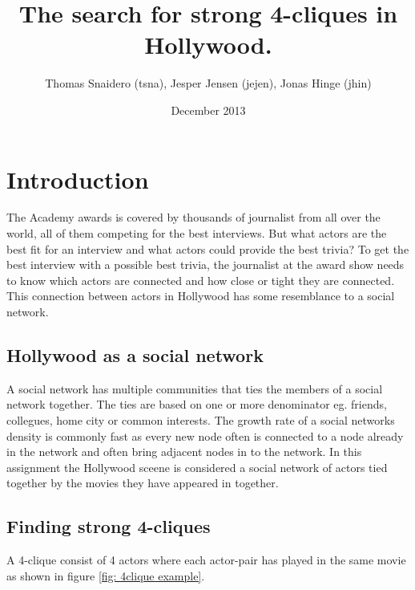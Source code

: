 \documentclass{article}
\title{The search for strong 4-cliques in Hollywood.}
\author{Thomas Snaidero (tsna), Jesper Jensen (jejen), Jonas Hinge (jhin)}
\date{December 2013}
\begin{document}
\maketitle

\section{Introduction}
The Academy awards is covered by thousands of journalist from all over the world, all of them competing for the best interviews. But what actors are the best fit for an interview and what actors could provide the best trivia?
To get the best interview with a possible best trivia, the journalist at the award show needs to know which actors are connected and how close or tight they are connected. This connection between actors in Hollywood has some resemblance to a social network.

\subsection{Hollywood as a social network}
A social network has multiple communities that ties the members of a social network together. The ties are based on one or more denominator eg. friends, collegues, home city or common interests.
The growth rate of a social networks density is commonly fast as every new node often is connected to a node already in the network and often bring adjacent nodes in to the network. In this assignment the Hollywood sceene is considered a social network of actors tied together by the movies they have appeared in together.

\subsection{Finding strong 4-cliques}
A 4-clique consist of 4 actors where each actor-pair has played in the same movie as shown in figure \ref{fig: 4clique example}.
\end{document}
